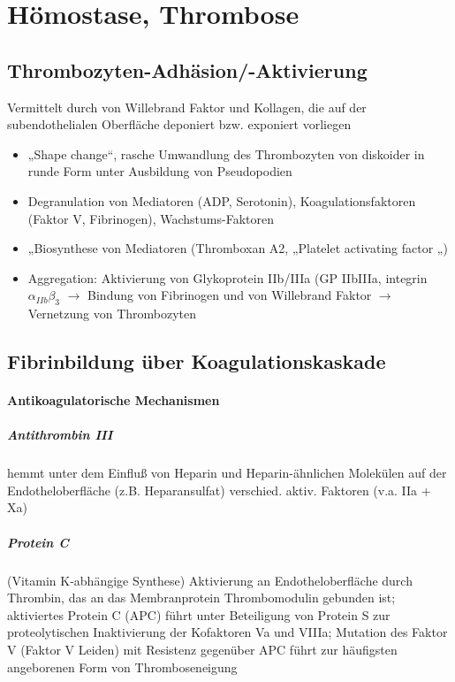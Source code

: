 \documentclass[10pt,a4paper]{report}
\begin{document}
\chapter{Hömostase, Thrombose} %
\label{cha:h_mostase_thrombose}
\section{Thrombozyten-Adhäsion/-Aktivierung} %
\label{sec:thrombozyten_adh_sion_aktivierung}
Vermittelt durch von Willebrand Faktor und Kollagen, die auf der subendothelialen Oberfläche deponiert bzw. exponiert vorliegen
\begin{itemize}
	\item „Shape change“, rasche Umwandlung des Thrombozyten von diskoider in runde Form unter Ausbildung von Pseudopodien
	\item Degranulation von Mediatoren (ADP, Serotonin), Koagulationsfaktoren (Faktor V, Fibrinogen), Wachstums-Faktoren
	\item „Biosynthese von Mediatoren (Thromboxan A2, „Platelet activating factor „)
	\item Aggregation: Aktivierung von Glykoprotein IIb/IIIa (GP IIbIIIa, integrin $\alpha_{IIb}\beta_3$ $\rightarrow$ Bindung von Fibrinogen und von Willebrand Faktor $\rightarrow$ Vernetzung von Thrombozyten 
\end{itemize}
\section{Fibrinbildung über Koagulationskaskade} %
\label{sec:fibrinbildung_ber_koagulationskaskade}
\subsubsection{Antikoagulatorische 
Mechanismen} %
\label{ssub:antikoagulatorische_mechanismen}
\paragraph{Antithrombin III} %
\label{par:antithrombin_iii}
hemmt unter dem Einfluß von Heparin und Heparin-ähnlichen Molekülen auf der Endotheloberfläche (z.B. Heparansulfat) verschied. aktiv. Faktoren (v.a. IIa + Xa) 
\paragraph{Protein C} %
\label{par:protein_c}
(Vitamin K-abhängige Synthese) Aktivierung an Endotheloberfläche durch Thrombin, das an das Membranprotein Thrombomodulin gebunden ist; aktiviertes Protein C (APC) führt unter Beteiligung von Protein S zur proteolytischen Inaktivierung der Kofaktoren Va und VIIIa; Mutation des Faktor V (Faktor V Leiden) mit Resistenz gegenüber APC führt zur häufigsten angeborenen Form von Thromboseneigung
\end{document}
